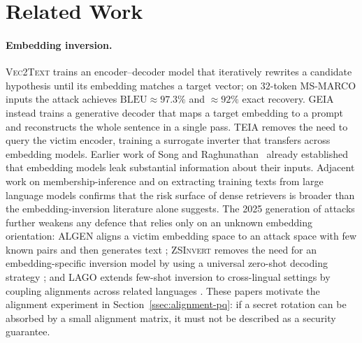 \documentclass[11pt,a4paper]{article}
\begin{document}
\section{Related Work}\label{sec:related}

\paragraph{Embedding inversion.} \textsc{Vec2Text} \cite{ref_vec2text}
trains an encoder--decoder model that iteratively rewrites a candidate
hypothesis until its embedding matches a target vector; on
$32$-token \textsc{MS-MARCO} inputs the attack achieves
$\mathrm{BLEU} \approx 97.3\%$ and $\approx 92\%$ exact recovery.
\textsc{GEIA} \cite{ref_geia} instead trains a generative decoder that maps
a target embedding to a prompt and reconstructs the whole sentence in a
single pass. \textsc{TEIA} \cite{ref_teia} removes the need to query the
victim encoder, training a surrogate inverter that transfers across
embedding models. Earlier work of Song and
Raghunathan~\cite{ref_song_leak} already established that embedding models
leak substantial information about their inputs. Adjacent work on
membership-inference \cite{ref_shokri} and on extracting training
texts from large language models \cite{ref_carlini} confirms that the
risk surface of dense retrievers is broader than the embedding-inversion
literature alone suggests. The 2025 generation of attacks further
weakens any defence that relies only on an unknown embedding orientation:
\textsc{ALGEN} aligns a victim embedding space to an attack space with
few known pairs and then generates text \cite{ref_algen};
\textsc{ZSInvert} removes the need for an embedding-specific inversion
model by using a universal zero-shot decoding strategy
\cite{ref_zsinvert}; and \textsc{LAGO} extends few-shot inversion to
cross-lingual settings by coupling alignments across related languages
\cite{ref_lago}. These papers motivate the alignment experiment in
Section~\ref{ssec:alignment-pq}: if a secret rotation can be absorbed by
a small alignment matrix, it must not be described as a security
guarantee.
\end{document}
